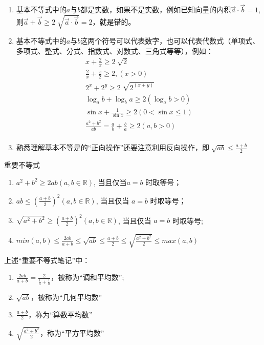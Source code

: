 \begin{note}
\begin{enumerate}
\item 基本不等式中的$a$与$b$都是实数，如果不是实数，例如已知向量的内积$\vec{a}\cdot \vec{b} = 1$, 则$\vec{a} + \vec{b} \geq 2\sqrt[]{\vec{a} \cdot \vec{b}} = 2$，就是错的。
\item 基本不等式中的$a$与$b$这两个符号可以代表数字，也可以代表代数式（单项式、多项式、整式、分式、指数式、对数式、三角式等等），例如：
\begin{eqnarray*}
\displaystyle x + \frac{2}{x} \geq 2\sqrt[]{2}\\
\displaystyle \frac{2}{x} + \frac{x}{2} \geq 2, (x >0)\\
2^x + 2^y \geq 2\sqrt[]{2^(x+y)}\\
\log_{a}{b} + \log_{b}{a} \geq 2 (\log_{a}{b} > 0)\\
\displaystyle \sin{x} + \frac{1}{\sin{x}} \geq 2 (0< \sin{x} \leq 1)\\
\displaystyle \frac{a^2+b^2}{ab} = \frac{a}{b} + \frac{b}{a} \geq 2 (a, b > 0)\\
\end{eqnarray*}
\item 熟悉理解基本不等是的“正向操作”还要注意利用反向操作，即$\displaystyle \sqrt[]{ab} \leq \frac{a+b}{2}$
\end{enumerate}
\end{note}

\begin{note}{重要不等式}
\begin{enumerate}
        \item $a^2+b^2 \geq 2ab (a,b \in \mathbb{R})$, 当且仅当$a=b$ 时取等号；
        \item \vspace{2mm} $\displaystyle ab \leq \left( \frac{a+b}{2}\right)^2 (a, b\in\mathbb{R})$, 当且仅当 $a=b$ 时取等号；
        \item \vspace{2mm} $\displaystyle \sqrt{a^2+b^2} \geq \left( \frac{a+b}{2}\right)^2 (a,b\in\mathbb{R})$, 当且仅当 $a=b$ 时取等号; 
        \item \vspace{2mm} $\displaystyle min(a, b) \leq \frac{2ab}{a+b} \leq \sqrt{ab} \leq \frac{a+b}{2} \leq \sqrt{\frac{a^2+b^2}{2}} \leq max(a, b) $
\end{enumerate}
\end{note}

\begin{remark}
上述“重要不等式笔记”中：
\begin{enumerate}
\item $\displaystyle \frac{2ab}{a+b}=\frac{2}{\frac{1}{a}+\frac{1}{b}}$，被称为“调和平均数”;
\item $\sqrt{ab}$，被称为“几何平均数”
\item $\frac{a+b}{2}$，称为“算数平均数”
\item $\sqrt{\frac{a^2+b^2}{2}}$，称为“平方平均数”
\end{enumerate}

\end{remark}

